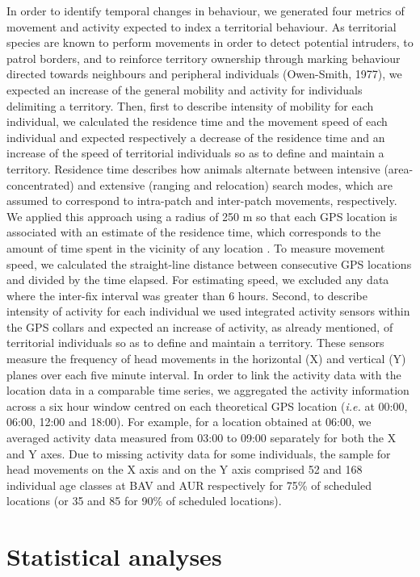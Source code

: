 \documentclass[a4paper,11pt]{article}
\begin{document}
In order to identify temporal changes in behaviour, we generated four
metrics of movement and activity expected to index a territorial
behaviour. As territorial species are known to perform movements in
order to detect potential intruders, to patrol borders, and to
reinforce territory ownership through marking behaviour directed
towards neighbours and peripheral individuals (Owen-Smith, 1977), we
expected an increase of the general mobility and activity for
individuals delimiting a territory. Then, first to describe intensity
of mobility for each individual, we calculated the residence time
\citep{barraquand_animal_2008} and the movement speed of each
individual and expected respectively a decrease of the residence time
and an increase of the speed of territorial individuals so as to
define and maintain a territory. Residence time describes how animals
alternate between intensive (area-concentrated) and extensive (ranging
and relocation) search modes, which are assumed to correspond to
intra-patch and inter-patch movements, respectively. We applied this
approach using a radius of 250 m so that each GPS location is
associated with an estimate of the residence time, which corresponds
to the amount of time spent in the vicinity of any location
\citep{barraquand_animal_2008}. To measure movement speed, we
calculated the straight-line distance between consecutive GPS
locations and divided by the time elapsed. For estimating speed, we
excluded any data where the inter-fix interval was greater than 6
hours. Second, to describe intensity of activity for each individual
we used integrated activity sensors within the GPS collars and
expected an increase of activity, as already mentioned, of territorial
individuals so as to define and maintain a territory. These sensors
measure the frequency of head movements in the horizontal (X) and
vertical (Y) planes over each five minute interval. In order to link
the activity data with the location data in a comparable time series,
we aggregated the activity information across a six hour window
centred on each theoretical GPS location (\textit{i.e.} at 00:00,
06:00, 12:00 and 18:00). For example, for a location obtained at
06:00, we averaged activity data measured from 03:00 to 09:00
separately for both the X and Y axes. Due to missing activity data for
some individuals, the sample for head movements on the X axis and on
the Y axis comprised 52 and 168 individual age classes at BAV and AUR
respectively for 75\% of scheduled locations (or 35 and 85 for 90\% of
scheduled locations).

\section*{Statistical analyses}
\end{document}

